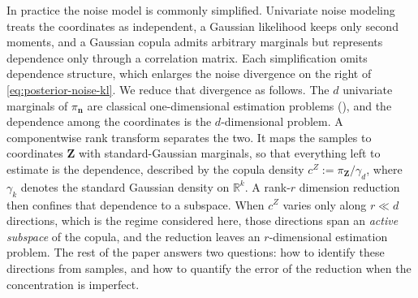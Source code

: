 \documentclass[review,hidelinks,onefignum,onetabnum]{siamart251216}
\newcommand{\RR}{\mathbb{R}}
\newcommand{\gauss}{\gamma}
\newcommand{\vn}{\bm{n}}
\newcommand{\vZ}{\bm{Z}}
\begin{document}
In practice the noise model is commonly simplified. Univariate noise modeling treats the coordinates as independent, a Gaussian likelihood keeps only second moments, and a Gaussian copula admits arbitrary marginals but represents dependence only through a correlation matrix. Each simplification omits dependence structure, which enlarges the noise divergence on the right of \eqref{eq:posterior-noise-kl}. We reduce that divergence as follows. The $d$ univariate marginals of $\pi_{\vn}$ are classical one-dimensional estimation problems (), and the dependence among the coordinates is the $d$-dimensional problem. A componentwise rank transform separates the two. It maps the samples to coordinates $\vZ$ with standard-Gaussian marginals, so that everything left to estimate is the dependence, described by the copula density $c^{Z} := \pi_{\vZ}/\gauss_d$, where $\gauss_k$ denotes the standard Gaussian density on $\RR^k$. A rank-$r$ dimension reduction then confines that dependence to a subspace. When $c^{Z}$ varies only along $r \ll d$ directions, which is the regime considered here, those directions span an \emph{active subspace} of the copula, and the reduction leaves an $r$-dimensional estimation problem. The rest of the paper answers two questions: how to identify these directions from samples, and how to quantify the error of the reduction when the concentration is imperfect.
\end{document}
